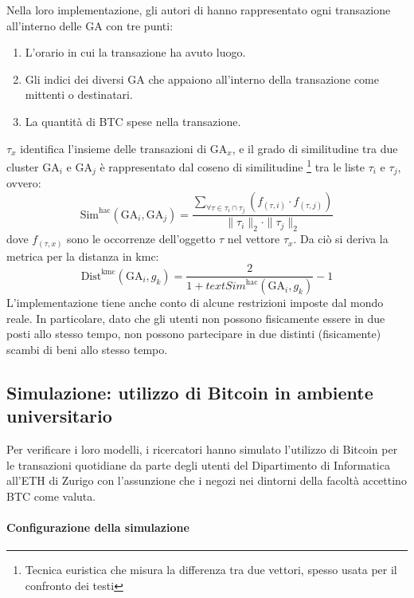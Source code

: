 Nella loro implementazione, gli autori di \cite{user-privacy} hanno rappresentato ogni transazione all'interno delle GA con tre punti:
\begin{enumerate}
    \item
        L'orario in cui la transazione ha avuto luogo.
    \item
        Gli indici dei diversi GA che appaiono all'interno della transazione come mittenti o destinatari.
    \item
        La quantità di BTC spese nella transazione.
\end{enumerate}
$\tau_x$ identifica l'insieme delle transazioni di $\text{GA}_x$, e il grado di similitudine tra due cluster $\text{GA}_i$ e $\text{GA}_j$ è rappresentato dal coseno di similitudine \footnote{Tecnica euristica che misura la differenza tra due vettori, spesso usata per il confronto dei testi} tra le liste $\tau_i$ e $\tau_j$, ovvero:
\[
\text{Sim}^\text{hac} \left( \text{GA}_i , \text{GA}_j \right) = \frac{\sum_{\forall \tau \in \tau_i \cap \tau_j} \left( f_{\left( \tau, i \right)} \cdot f_{\left( \tau, j \right)} \right) }{ \| \tau_i \|_2 \cdot \| \tau_j \|_2 }
\]
dove $f_{\left( \tau, x \right)}$ sono le occorrenze dell'oggetto $\tau$ nel vettore $\tau_x$.
Da ciò si deriva la metrica per la distanza in \gls{kmc}:
\[
\text{Dist}^\text{kmc} \left( \text{GA}_i , g_k \right) = \frac{2}{ 1 + text{Sim}^\text{hac} \left( \text{GA}_i , g_k \right) } - 1
\]
L'implementazione tiene anche conto di alcune restrizioni imposte dal mondo reale. In particolare, dato che gli utenti non possono fisicamente essere in due posti allo stesso tempo, non possono partecipare in due distinti (fisicamente) scambi di beni allo stesso tempo.

\subsection{Simulazione: utilizzo di Bitcoin in ambiente universitario}\label{utilizzo-simulatore-privacy-utente}

Per verificare i loro modelli, i ricercatori hanno simulato l'utilizzo di Bitcoin per le transazioni quotidiane da parte degli utenti del Dipartimento di Informatica all'ETH di Zurigo con l'assunzione che i negozi nei dintorni della facoltà accettino BTC come valuta.

\paragraph{Configurazione della simulazione}

